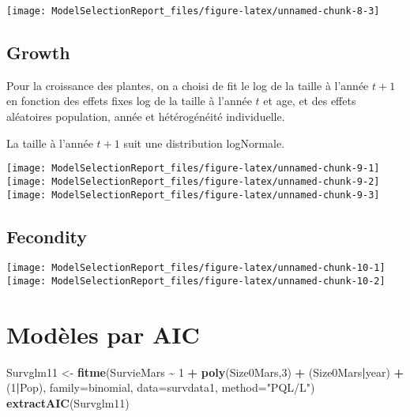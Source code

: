 \documentclass[
]{article}
\newenvironment{Shaded}{\begin{snugshade}}{\end{snugshade}}
\newcommand{\AttributeTok}[1]{\textcolor[rgb]{0.13,0.29,0.53}{#1}}
\newcommand{\DecValTok}[1]{\textcolor[rgb]{0.00,0.00,0.81}{#1}}
\newcommand{\FunctionTok}[1]{\textcolor[rgb]{0.13,0.29,0.53}{\textbf{#1}}}
\newcommand{\NormalTok}[1]{#1}
\newcommand{\OtherTok}[1]{\textcolor[rgb]{0.56,0.35,0.01}{#1}}
\newcommand{\SpecialCharTok}[1]{\textcolor[rgb]{0.81,0.36,0.00}{\textbf{#1}}}
\newcommand{\StringTok}[1]{\textcolor[rgb]{0.31,0.60,0.02}{#1}}
\begin{document}
\texttt{[image: ModelSelectionReport\_files/figure-latex/unnamed-chunk-8-3]}

\subsection{Growth}\label{growth}

Pour la croissance des plantes, on a choisi de fit le log de la taille à
l'année \(t+1\) en fonction des effets fixes log de la taille à l'année
\(t\) et age, et des effets aléatoires population, année et
hétérogénéité individuelle.

La taille à l'année \(t+1\) suit une distribution logNormale.

\texttt{[image: ModelSelectionReport\_files/figure-latex/unnamed-chunk-9-1]}
\texttt{[image: ModelSelectionReport\_files/figure-latex/unnamed-chunk-9-2]}
\texttt{[image: ModelSelectionReport\_files/figure-latex/unnamed-chunk-9-3]}

\subsection{Fecondity}\label{fecondity}

\texttt{[image: ModelSelectionReport\_files/figure-latex/unnamed-chunk-10-1]}
\texttt{[image: ModelSelectionReport\_files/figure-latex/unnamed-chunk-10-2]}

\section{Modèles par AIC}\label{moduxe8les-par-aic}

\begin{Shaded}
\begin{Highlighting}[]
\NormalTok{Survglm11 }\OtherTok{\textless{}{-}} \FunctionTok{fitme}\NormalTok{(SurvieMars }\SpecialCharTok{\textasciitilde{}} \DecValTok{1} \SpecialCharTok{+} \FunctionTok{poly}\NormalTok{(Size0Mars,}\DecValTok{3}\NormalTok{) }\SpecialCharTok{+} 
\NormalTok{                                  (Size0Mars}\SpecialCharTok{|}\NormalTok{year) }\SpecialCharTok{+}\NormalTok{ (}\DecValTok{1}\SpecialCharTok{|}\NormalTok{Pop),}
                  \AttributeTok{family=}\NormalTok{binomial,}
                  \AttributeTok{data=}\NormalTok{survdata1,}
                  \AttributeTok{method=}\StringTok{"PQL/L"}\NormalTok{)}
\FunctionTok{extractAIC}\NormalTok{(Survglm11)}
\end{Highlighting}
\end{Shaded}
\end{document}
